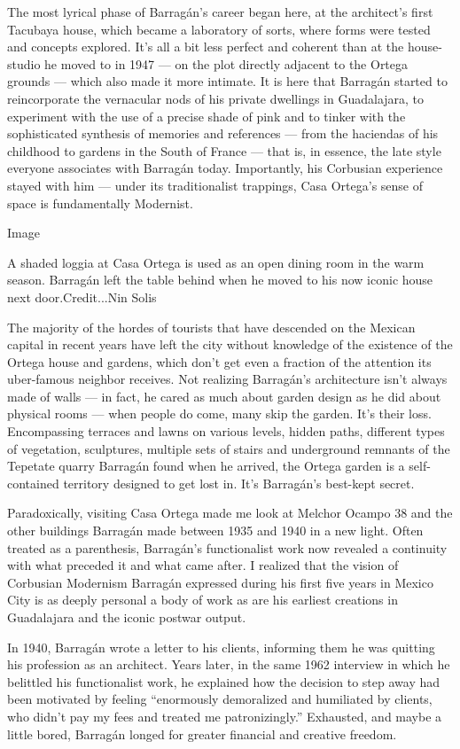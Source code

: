The most lyrical phase of Barragán's career began here, at the
architect's first Tacubaya house, which became a laboratory of sorts,
where forms were tested and concepts explored. It's all a bit less
perfect and coherent than at the house-studio he moved to in 1947 --- on
the plot directly adjacent to the Ortega grounds --- which also made it
more intimate. It is here that Barragán started to reincorporate the
vernacular nods of his private dwellings in Guadalajara, to experiment
with the use of a precise shade of pink and to tinker with the
sophisticated synthesis of memories and references --- from the
haciendas of his childhood to gardens in the South of France --- that
is, in essence, the late style everyone associates with Barragán today.
Importantly, his Corbusian experience stayed with him --- under its
traditionalist trappings, Casa Ortega's sense of space is fundamentally
Modernist.

Image

A shaded loggia at Casa Ortega is used as an open dining room in the
warm season. Barragán left the table behind when he moved to his now
iconic house next door.Credit...Nin Solis

The majority of the hordes of tourists that have descended on the
Mexican capital in recent years have left the city without knowledge of
the existence of the Ortega house and gardens, which don't get even a
fraction of the attention its uber-famous neighbor receives. Not
realizing Barragán's architecture isn't always made of walls --- in
fact, he cared as much about garden design as he did about physical
rooms --- when people do come, many skip the garden. It's their loss.
Encompassing terraces and lawns on various levels, hidden paths,
different types of vegetation, sculptures, multiple sets of stairs and
underground remnants of the Tepetate quarry Barragán found when he
arrived, the Ortega garden is a self-contained territory designed to get
lost in. It's Barragán's best-kept secret.

Paradoxically, visiting Casa Ortega made me look at Melchor Ocampo 38
and the other buildings Barragán made between 1935 and 1940 in a new
light. Often treated as a parenthesis, Barragán's functionalist work now
revealed a continuity with what preceded it and what came after. I
realized that the vision of Corbusian Modernism Barragán expressed
during his first five years in Mexico City is as deeply personal a body
of work as are his earliest creations in Guadalajara and the iconic
postwar output.

In 1940, Barragán wrote a letter to his clients, informing them he was
quitting his profession as an architect. Years later, in the same 1962
interview in which he belittled his functionalist work, he explained how
the decision to step away had been motivated by feeling ``enormously
demoralized and humiliated by clients, who didn't pay my fees and
treated me patronizingly.'' Exhausted, and maybe a little bored,
Barragán longed for greater financial and creative freedom.

